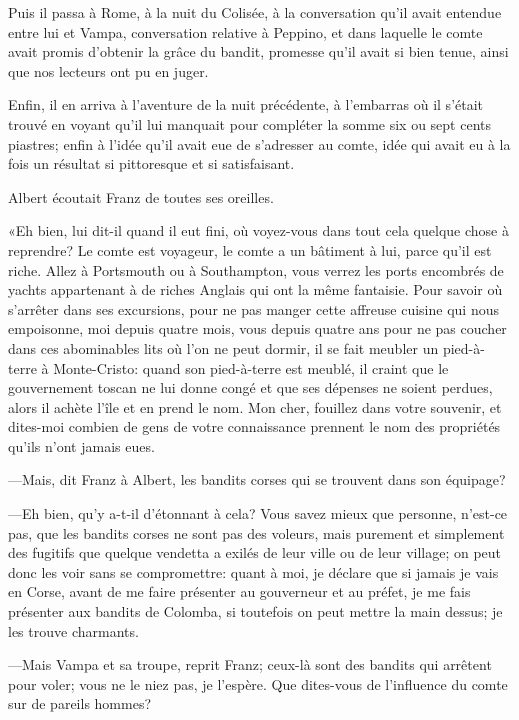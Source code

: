 Puis il passa à Rome, à la nuit du Colisée, à la conversation qu'il avait entendue entre lui et Vampa, conversation relative à Peppino, et dans laquelle le comte avait promis d'obtenir la grâce du bandit, promesse qu'il avait si bien tenue, ainsi que nos lecteurs ont pu en juger. 

Enfin, il en arriva à l'aventure de la nuit précédente, à l'embarras où il s'était trouvé en voyant qu'il lui manquait pour compléter la somme six ou sept cents piastres; enfin à l'idée qu'il avait eue de s'adresser au comte, idée qui avait eu à la fois un résultat si pittoresque et si satisfaisant. 

Albert écoutait Franz de toutes ses oreilles. 

«Eh bien, lui dit-il quand il eut fini, où voyez-vous dans tout cela quelque chose à reprendre? Le comte est voyageur, le comte a un bâtiment à lui, parce qu'il est riche. Allez à Portsmouth ou à Southampton, vous verrez les ports encombrés de yachts appartenant à de riches Anglais qui ont la même fantaisie. Pour savoir où s'arrêter dans ses excursions, pour ne pas manger cette affreuse cuisine qui nous empoisonne, moi depuis quatre mois, vous depuis quatre ans pour ne pas coucher dans ces abominables lits où l'on ne peut dormir, il se fait meubler un pied-à-terre à Monte-Cristo: quand son pied-à-terre est meublé, il craint que le gouvernement toscan ne lui donne congé et que ses dépenses ne soient perdues, alors il achète l'île et en prend le nom. Mon cher, fouillez dans votre souvenir, et dites-moi combien de gens de votre connaissance prennent le nom des propriétés qu'ils n'ont jamais eues.  

—Mais, dit Franz à Albert, les bandits corses qui se trouvent dans son équipage? 

—Eh bien, qu'y a-t-il d'étonnant à cela? Vous savez mieux que personne, n'est-ce pas, que les bandits corses ne sont pas des voleurs, mais purement et simplement des fugitifs que quelque vendetta a exilés de leur ville ou de leur village; on peut donc les voir sans se compromettre: quant à moi, je déclare que si jamais je vais en Corse, avant de me faire présenter au gouverneur et au préfet, je me fais présenter aux bandits de Colomba, si toutefois on peut mettre la main dessus; je les trouve charmants. 

—Mais Vampa et sa troupe, reprit Franz; ceux-là sont des bandits qui arrêtent pour voler; vous ne le niez pas, je l'espère. Que dites-vous de l'influence du comte sur de pareils hommes? 


